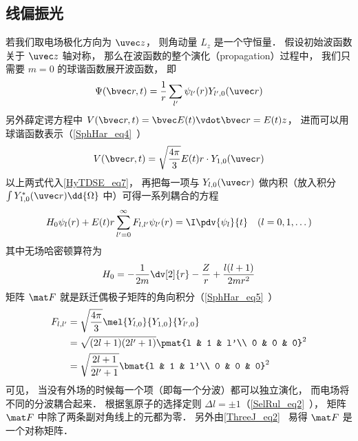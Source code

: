 \subsection{线偏振光}
若我们取电场极化方向为 $\uvec z$， 则角动量 $L_z$ 是一个守恒量． 假设初始波函数关于 $\uvec z$ 轴对称， 那么在波函数的整个演化（propagation）过程中， 我们只需要 $m=0$ 的球谐函数展开波函数， 即
\begin{equation}
\Psi(\bvec r, t) = \frac{1}{r}\sum_{l'} \psi_{l'}(r) Y_{l', 0}(\uvec r)
\end{equation}
另外薛定谔方程中 $V(\bvec r, t) = \bvec E(t) \vdot \bvec r = E(t) z$， 进而可以用球谐函数表示（\autoref{SphHar_eq4}~）
\begin{equation}
V(\bvec r, t) = \sqrt{\frac{4\pi}{3}} E(t) r \cdot Y_{1,0}(\uvec r)
\end{equation}
以上两式代入\autoref{HyTDSE_eq7}， 再把每一项与 $Y_{l,0}(\uvec r)$ 做内积（放入积分 $\int Y_{1,0}^*(\uvec r) \dd{\Omega}$ 中）可得一系列耦合的方程
\begin{equation}\label{HyTDSE_eq4}
H_0 \psi_{l}(r) + E(t)r\sum_{l' = 0}^{\infty} F_{l, l'} \psi_{l'}(r) = \I \pdv{\psi_{l}}{t} \quad (l=0,1,\dots)
\end{equation}
其中无场哈密顿算符为
\begin{equation}
H_0 = -\frac{1}{2m} \dv[2]{r} -\frac{Z}{r} + \frac{l(l+1)}{2mr^2}
\end{equation}
矩阵 $\mat F$ 就是跃迁偶极子矩阵的角向积分（\autoref{SphHar_eq5}~）
\begin{equation}
\begin{aligned}
F_{l,l'} &= \sqrt{\frac{4\pi}{3}} \mel{Y_{l,0}}{Y_{1,0}}{Y_{l',0}}\\
&= \sqrt{(2l+1)(2l'+1)} \pmat{l & 1 & l'\\ 0 & 0 & 0}^2\\
&= \sqrt{\frac{2l+1}{2l'+1}} \bmat{l & 1 & l'\\ 0 & 0 & 0}^2
\end{aligned}
\end{equation}
可见， 当没有外场的时候每一个项（即每一个分波）都可以独立演化， 而电场将不同的分波耦合起来． 根据氢原子的选择定则 $\Delta l = \pm 1$（\autoref{SelRul_eq2}~）， 矩阵 $\mat F$ 中除了两条副对角线上的元都为零． 另外由\autoref{ThreeJ_eq2}~ 易得 $\mat F$ 是一个对称矩阵．

